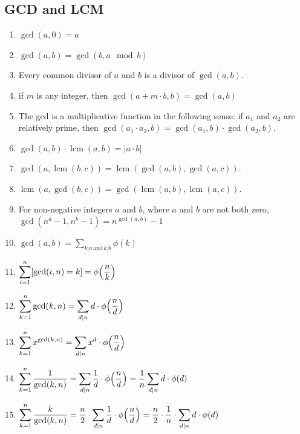 \subsection{GCD and LCM}
\begin{enumerate}[resume]
    \item $\displaystyle \gcd(a, 0) = a$
    \item $\displaystyle \gcd(a, b) = \gcd(b, a \mod b)$
    \item Every common divisor of $\displaystyle a$ and $b$ is a divisor of $\displaystyle \gcd(a,b)$.
    \item if $m$ is any integer, then $\displaystyle \gcd(a + m {\cdot} b, b) = \gcd(a, b)$
    \item The gcd is a multiplicative function in the following sense: if $\displaystyle a_1$ and $\displaystyle a_2$ are relatively prime, then $\displaystyle \gcd(a_1 \cdot a_2, b) = \gcd(a_1, b) \cdot \gcd(a_2,b )$.
    \item $\displaystyle \gcd(a, b){\cdot} \operatorname{lcm}(a, b) = |a{\cdot}b|$
    \item $\displaystyle \gcd(a, \operatorname{lcm}(b, c)) = \operatorname{lcm}(\gcd(a, b), \gcd(a, c))$.
    \item $\displaystyle \operatorname{lcm}(a, \gcd(b, c)) = \gcd(\operatorname{lcm}(a, b), \operatorname{lcm}(a, c))$.
    \item For non-negative integers $\displaystyle a$ and $b$, where $\displaystyle a$ and $b$ are not both zero, $\displaystyle \gcd({n^a} - 1, {n^b} - 1) = n^{\gcd(a,b)} - 1$
    \item $\displaystyle \gcd(a, b) = \displaystyle \sum_{k|a \, \text{and} \, k|b} {\phi(k)}$
    \item $\displaystyle \displaystyle \sum_{i=1}^n [\gcd(i, n) = k] = { \phi{\left(\frac{n}{k}\right)}}$
    \item $\displaystyle \displaystyle \sum_{k=1}^n \gcd(k, n) = \displaystyle \sum_{d|n} d \cdot {\phi{\left(\frac{n}{d}\right)}}$
    \item $\displaystyle \displaystyle \sum_{k=1}^n x^{\gcd(k,n)} = \displaystyle \sum_{d|n} x^d \cdot {\phi{\left(\frac{n}{d}\right)}}$
    \item $\displaystyle \displaystyle \sum_{k=1}^n \frac{1}{\gcd(k, n)} = \displaystyle \sum_{d|n} \frac{1}{d} \cdot {\phi{\left(\frac{n}{d}\right)}} = \frac{1}{n} \displaystyle \sum_{d|n} d \cdot \phi(d)$
    \item $\displaystyle \displaystyle \sum_{k=1}^n \frac{k}{\gcd(k, n)} = \frac{n}{2} \cdot \displaystyle \sum_{d|n} \frac{1}{d} \cdot {\phi{\left(\frac{n}{d}\right)}} = \frac{n}{2} \cdot \frac{1}{n} \cdot \displaystyle \sum_{d|n} d \cdot \phi(d)$

\end{enumerate}
